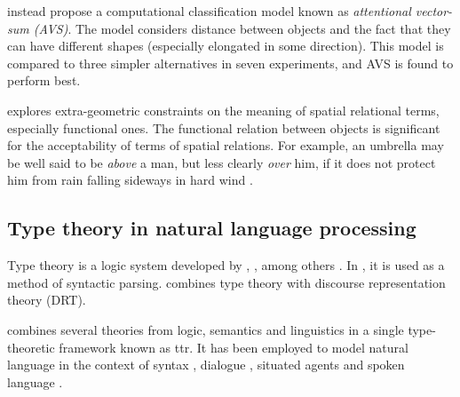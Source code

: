 \cite{RegierGroundingspatiallanguage2001a} instead propose a computational classification model known as \textit{attentional vector-sum (AVS)}.
The model considers distance between objects and the fact that they can have different shapes (especially elongated in some direction).
This model is compared to three simpler alternatives in seven experiments, and AVS is found to perform best.

\cite{CoventryInterplayGeometryFunction2001} explores extra-geometric constraints on the meaning of spatial relational terms, especially functional ones.
The functional relation between objects is significant for the acceptability of terms of spatial relations.
For example, an umbrella may be well said to be \textit{above} a man, but less clearly \textit{over} him, if it does not protect him from rain falling sideways in hard wind \citep{CoventryInterplayGeometryFunction2001}.




\subsection{Type theory in natural language processing}
\label{ssec:ttnlp}

Type theory is a logic system developed by \cite{WhiteheadPrincipiamathematica1910}, \cite{church40}, \cite{martinlof84} among others \citep{CoquandTypeTheory2015}.
In \cite{RantaTypetheoreticalGrammar1995}, it is used as a method of syntactic parsing.
\cite{KohlhaseTypeTheoreticSemanticslDRT1996} combines type theory with discourse representation theory (DRT).


\cite{CooperRecordsRecordTypes2005} combines several theories from logic, semantics and linguistics in a single type-theoretic framework known as \acrfull{ttr}.
It has been employed to model natural language in the context of
syntax \citep{CooperAustiniantruthattitudes2005, CooperRecordsRecordTypes2005, CooperTypetheorysemantics2012, CooperTypetheorylanguage2016},
dialogue \citep{Larssonformalviewcorrective2009, LarssonDialoguesHaveContent2011, CooperTypetheorylanguage2016},
situated agents \citep{DobnikModellinglanguageaction2012, ttrspat,lspc} and
spoken language \citep{CooperTypetheorylanguage2016}.



